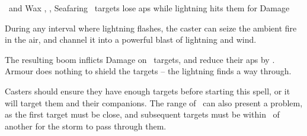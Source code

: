   {\mAir\ and \mFire}%
  {Wax}%
  {\detailed, \divergent, \duplicated}%
  {Seafaring}%
  {\spellArea\ targets lose  \glspl{ap} while lightning hits them for  Damage}%
  {
    During any \gls{interval} where lightning flashes, the caster can seize the ambient fire in the air, and channel it into a powerful blast of lightning and wind.

    The resulting boom inflicts  Damage on \spellArea\ targets, and reduce their \glspl{ap} by .
    Armour does nothing to shield the targets -- the lightning finds a way through.

    Casters should ensure they have enough targets before starting this spell, or it will target them and their companions.
    The range of \spellRange\ can also present a problem, as the first target must be close, and subsequent targets must be within \spellRange\ of another for the storm to pass through them.
  }
